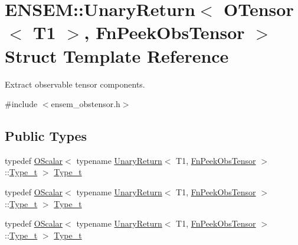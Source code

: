\hypertarget{structENSEM_1_1UnaryReturn_3_01OTensor_3_01T1_01_4_00_01FnPeekObsTensor_01_4}{}\section{E\+N\+S\+EM\+:\+:Unary\+Return$<$ O\+Tensor$<$ T1 $>$, Fn\+Peek\+Obs\+Tensor $>$ Struct Template Reference}
\label{structENSEM_1_1UnaryReturn_3_01OTensor_3_01T1_01_4_00_01FnPeekObsTensor_01_4}


Extract observable tensor components.  




{\ttfamily \#include $<$ensem\+\_\+obstensor.\+h$>$}

\subsection*{Public Types}
\begin{DoxyCompactItemize}
\item 
typedef \mbox{\hyperlink{classENSEM_1_1OScalar}{O\+Scalar}}$<$ typename \mbox{\hyperlink{structENSEM_1_1UnaryReturn}{Unary\+Return}}$<$ T1, \mbox{\hyperlink{structENSEM_1_1FnPeekObsTensor}{Fn\+Peek\+Obs\+Tensor}} $>$\+::\mbox{\hyperlink{structENSEM_1_1UnaryReturn_3_01OTensor_3_01T1_01_4_00_01FnPeekObsTensor_01_4_abefeb4103abe844c4b6cbc2df22fd844}{Type\+\_\+t}} $>$ \mbox{\hyperlink{structENSEM_1_1UnaryReturn_3_01OTensor_3_01T1_01_4_00_01FnPeekObsTensor_01_4_abefeb4103abe844c4b6cbc2df22fd844}{Type\+\_\+t}}
\item 
typedef \mbox{\hyperlink{classENSEM_1_1OScalar}{O\+Scalar}}$<$ typename \mbox{\hyperlink{structENSEM_1_1UnaryReturn}{Unary\+Return}}$<$ T1, \mbox{\hyperlink{structENSEM_1_1FnPeekObsTensor}{Fn\+Peek\+Obs\+Tensor}} $>$\+::\mbox{\hyperlink{structENSEM_1_1UnaryReturn_3_01OTensor_3_01T1_01_4_00_01FnPeekObsTensor_01_4_abefeb4103abe844c4b6cbc2df22fd844}{Type\+\_\+t}} $>$ \mbox{\hyperlink{structENSEM_1_1UnaryReturn_3_01OTensor_3_01T1_01_4_00_01FnPeekObsTensor_01_4_abefeb4103abe844c4b6cbc2df22fd844}{Type\+\_\+t}}
\item 
typedef \mbox{\hyperlink{classENSEM_1_1OScalar}{O\+Scalar}}$<$ typename \mbox{\hyperlink{structENSEM_1_1UnaryReturn}{Unary\+Return}}$<$ T1, \mbox{\hyperlink{structENSEM_1_1FnPeekObsTensor}{Fn\+Peek\+Obs\+Tensor}} $>$\+::\mbox{\hyperlink{structENSEM_1_1UnaryReturn_3_01OTensor_3_01T1_01_4_00_01FnPeekObsTensor_01_4_abefeb4103abe844c4b6cbc2df22fd844}{Type\+\_\+t}} $>$ \mbox{\hyperlink{structENSEM_1_1UnaryReturn_3_01OTensor_3_01T1_01_4_00_01FnPeekObsTensor_01_4_abefeb4103abe844c4b6cbc2df22fd844}{Type\+\_\+t}}
\end{DoxyCompactItemize}


